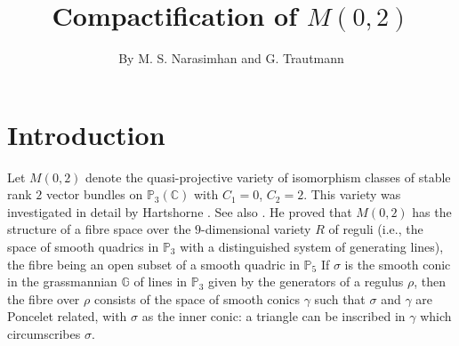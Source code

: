 \title{Compactification of $M(0,2)$}

\author{By M. S. Narasimhan and G. Trautmann}

\date{}
\maketitle

\setcounter{page}{325}
\setcounter{pageoriginal}{428}
\section{Introduction}\label{s1}\pageoriginale

Let $M(0,2)$ denote the quasi-projective variety of isomorphism
classes of stable rank $2$ vector bundles on $\mathbb{P}_3(\mathbb{C})$
with $C_1=0$, $C_2=2$. This variety was investigated in detail by
Hartshorne \cite{key1}. See also \cite{key2}. He proved that $M(0,2)$
has the structure of a fibre space over the $9$-dimensional variety
$R$ of reguli (i.e., the space of smooth quadrics in $\mathbb{P}_3$
with a distinguished system of generating lines), the fibre being an
open subset of a smooth quadric in $\mathbb{P}_5$ If $\sigma$ is the
smooth conic in the grassmannian $\mathbb{G}$ of lines in
$\mathbb{P}_3$ given by the generators of a regulus $\rho$, then the
fibre over $\rho$ consists of the space of smooth conics $\gamma$ such
that $\sigma$ and $\gamma$ are Poncelet related, with $\sigma$ as the
inner conic: a triangle can be inscribed in $\gamma$ which
circumscribes $\sigma$. 

